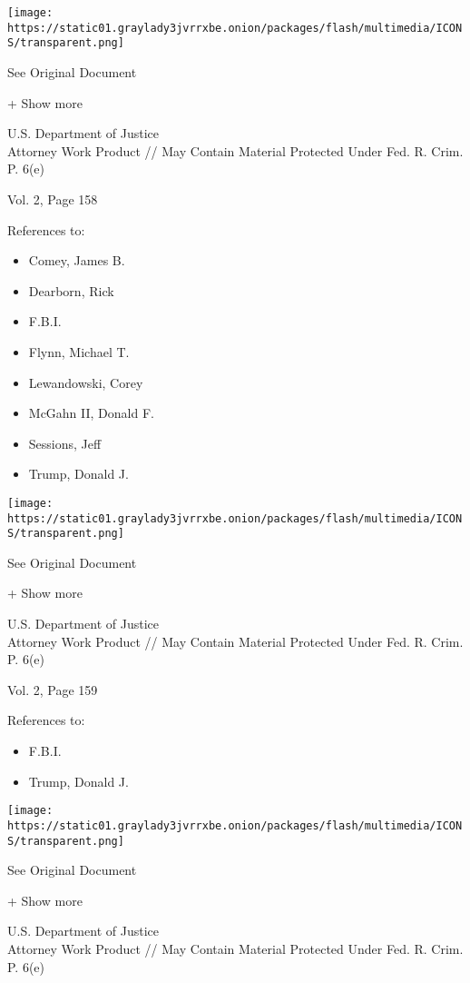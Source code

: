 \protect\hyperlink{}{}

\texttt{[image: https://static01.graylady3jvrrxbe.onion/packages/flash/multimedia/ICONS/transparent.png]}

See Original Document

+ Show more

U.S. Department of Justice\\
Attorney Work Product // May Contain Material Protected Under Fed. R.
Crim. P. 6(e)

Vol. 2, Page 158

References to:

\begin{itemize}
\tightlist
\item
  Comey, James B.
\item
  Dearborn, Rick
\item
  F.B.I.
\item
  Flynn, Michael T.
\item
  Lewandowski, Corey
\item
  McGahn II, Donald F.
\item
  Sessions, Jeff
\item
  Trump, Donald J.
\end{itemize}

\protect\hyperlink{}{}

\texttt{[image: https://static01.graylady3jvrrxbe.onion/packages/flash/multimedia/ICONS/transparent.png]}

See Original Document

+ Show more

U.S. Department of Justice\\
Attorney Work Product // May Contain Material Protected Under Fed. R.
Crim. P. 6(e)

Vol. 2, Page 159

References to:

\begin{itemize}
\tightlist
\item
  F.B.I.
\item
  Trump, Donald J.
\end{itemize}

\protect\hyperlink{}{}

\texttt{[image: https://static01.graylady3jvrrxbe.onion/packages/flash/multimedia/ICONS/transparent.png]}

See Original Document

+ Show more

U.S. Department of Justice\\
Attorney Work Product // May Contain Material Protected Under Fed. R.
Crim. P. 6(e)

